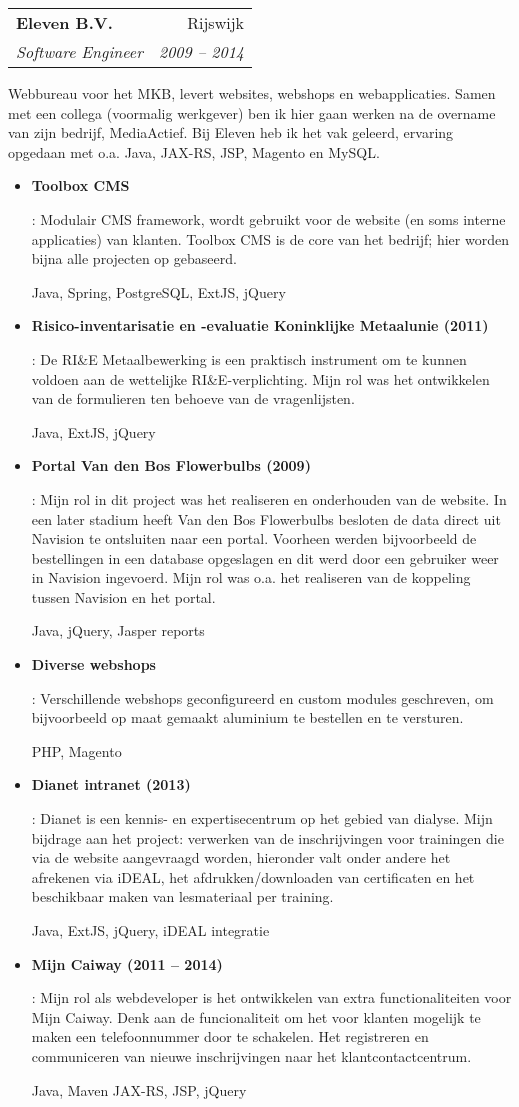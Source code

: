 \documentclass[a4paper,11pt]{article}
\makeatletter
\newcommand{\resumeItem}[2]{
  \item\small{
    \textbf{#1}{: #2 \vspace{-2pt}}
  }
}
\newcommand{\resumeSubheading}[4]{
  \vspace{-1pt}\item
    \begin{tabular*}{0.97\textwidth}[t]{l@{\extracolsep{\fill}}r}
      \textbf{#1} & #2 \\
      \textit{\small#3} & \textit{\small #4} \\
    \end{tabular*}\vspace{-2pt}
}
\newcommand{\resumeItemListStart}{\begin{itemize}}
\newcommand{\resumeItemListEnd}{\end{itemize}\vspace{-5pt}}
\makeatother
\begin{document}
    \resumeSubheading
      {Eleven B.V.}{Rijswijk}
      {Software Engineer}{2009 -- 2014}
	  \par
	  Webbureau voor het MKB, levert websites, webshops en webapplicaties. Samen met een collega 
	  (voormalig werkgever) ben ik hier gaan werken na de overname van zijn bedrijf, MediaActief.
	  Bij Eleven heb ik het vak geleerd, ervaring opgedaan met o.a. Java, JAX-RS, JSP, Magento 
	  en MySQL.
      \resumeItemListStart
        \resumeItem{Toolbox CMS}
          {Modulair CMS framework, wordt gebruikt voor de website (en soms interne applicaties) 
		  van klanten. Toolbox CMS is de core van het bedrijf; hier worden bijna alle projecten op
		  gebaseerd.
		  \par
		  Java, Spring, PostgreSQL, ExtJS, jQuery}
        \resumeItem{Risico-inventarisatie en -evaluatie Koninklijke Metaalunie (2011)}
          {De RI\&E Metaalbewerking is een praktisch instrument om te kunnen voldoen aan
		  de wettelijke RI\&E-verplichting. Mijn rol was het ontwikkelen van de formulieren ten 
		  behoeve van de vragenlijsten.
		  \par
		  Java, ExtJS, jQuery}
		\resumeItem{Portal Van den Bos Flowerbulbs (2009)}
		  {Mijn rol in dit project was het realiseren
		  en onderhouden van de website. In een later stadium heeft Van den Bos Flowerbulbs besloten
		  de data direct uit Navision te ontsluiten naar een portal. Voorheen werden bijvoorbeeld de 
		  bestellingen in een database opgeslagen en dit werd door een gebruiker weer in Navision
		  ingevoerd. Mijn rol was o.a. het realiseren van de koppeling tussen Navision en het portal.
          \par
		  Java, jQuery, Jasper reports}
		\resumeItem{Diverse webshops}
          {Verschillende webshops geconfigureerd en custom modules geschreven, om bijvoorbeeld op
		  maat gemaakt aluminium te bestellen en te versturen.
		  \par
		  PHP, Magento}
        \resumeItem{Dianet intranet (2013)}
          {Dianet is een kennis- en expertisecentrum op het gebied van dialyse. Mijn bijdrage aan het
		  project: verwerken van de inschrijvingen voor trainingen die via de website aangevraagd 
		  worden, hieronder valt onder andere het afrekenen via iDEAL, het afdrukken/downloaden 
		  van certificaten en het beschikbaar maken van lesmateriaal per training.
		  \par
		  Java, ExtJS, jQuery, iDEAL integratie}
        \resumeItem{Mijn Caiway (2011 -- 2014)}
          {Mijn rol als webdeveloper is het ontwikkelen van extra functionaliteiten voor Mijn Caiway. 
		  Denk aan de funcionaliteit om het voor klanten mogelijk te maken een telefoonnummer door te
		  schakelen. Het registreren en communiceren van nieuwe inschrijvingen naar het klantcontactcentrum.
		  \par
		  Java, Maven JAX-RS, JSP, jQuery}
      \resumeItemListEnd
\end{document}
